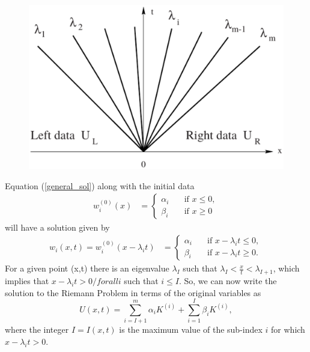 \documentclass[]{article}
\begin{document}
		\begin{figure}[h] 	
			\centering
			\includegraphics[scale=.30]{CharacteristicFanRP}
			\caption{}
			\label{CharacteristicFanRP}
		\end{figure} 	
		Equation (\ref{general_sol}) along with the initial data
		\begin{equation}
	    	\begin{aligned}
			w^{(0)}_i(x) &= \left\{
			\begin{array}{ll}
			\alpha_i & \quad \mbox{if } x \leq 0, \\
			\beta_i & \quad \mbox{if } x \geq 0
			\end{array}
			\right.
			\end{aligned}
		\end{equation}
		will have a solution given by
		\begin{equation}	    \begin{aligned}
			w_i(x,t) = w^{(0)}_i(x - \lambda_i t) &= \left\{
			\begin{array}{ll}
			\alpha_i & \quad \mbox{if } x - \lambda_i t \leq 0, \\
			\beta_i & \quad \mbox{if } x - \lambda_i t \geq 0.
			\end{array}
			\right.					
			\end{aligned}
		\end{equation}
		For a given point (x,t) there is an eigenvalue $ \lambda_I $ such that $ \lambda_I < \frac{x}{t} < \lambda_{I+1}$, which implies that $ x - \lambda_i t > 0 /forall i$ such that $ i \leq I$. So, we can now write the solution to the Riemann Problem in terms of the original variables as 
		\begin{equation}
			U(x,t) = \sum_{i = I+1}^{m} \alpha_i K^{(i)} + \sum_{i = 1}^{I} \beta_i K^{(i)},
		\end{equation}where the integer $ I = I(x,t) $ is the maximum value of the sub-index $ i $ for which $ x - \lambda_i t > 0 $.
\end{document}
